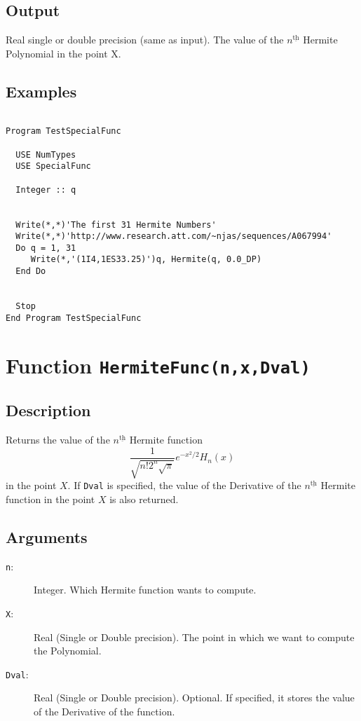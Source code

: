\subsection{Output}

Real single or double precision (same as input). The value of the
$n^{\underline{\text{th}}}$ Hermite Polynomial in the point X.

\subsection{Examples}

\begin{verbatim}

Program TestSpecialFunc

  USE NumTypes
  USE SpecialFunc

  Integer :: q


  Write(*,*)'The first 31 Hermite Numbers'
  Write(*,*)'http://www.research.att.com/~njas/sequences/A067994'
  Do q = 1, 31
     Write(*,'(1I4,1ES33.25)')q, Hermite(q, 0.0_DP)
  End Do


  Stop
End Program TestSpecialFunc
\end{verbatim}

\section{Function \texttt{HermiteFunc(n,x,Dval)}}

\subsection{Description}

Returns the value of the $n^{\underline{\text{th}}}$ Hermite
function
\begin{equation}
  \frac{1}{\sqrt{n!2^n\sqrt{\pi}}}e^{-x^2/2}H_n(x)
\end{equation}
in the point $X$. If \texttt{Dval} is specified, the value
of the Derivative of the $n^{\underline{\text{th}}}$ Hermite
function in the point $X$ is also returned.

\subsection{Arguments}

\begin{description}
\item[\texttt{n}:] Integer. Which Hermite function wants to compute.
\item[\texttt{X}:] Real (Single or Double precision). The point in
  which we want to compute the Polynomial.
\item[\texttt{Dval}:] Real (Single or Double precision). Optional. If
  specified, it stores the value of the Derivative of the
  function.
\end{description}

